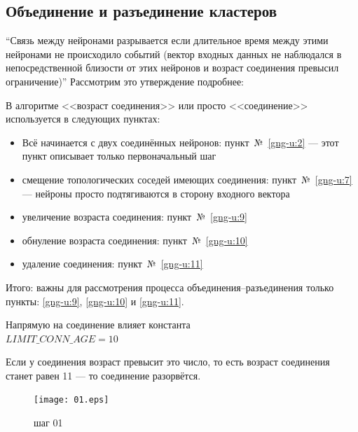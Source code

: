 \documentclass[unicode, 12pt, a4paper,oneside,fleqn]{article}
\begin{document}
\subsection{Объединение и разъединение кластеров}
``Связь между нейронами разрывается если длительное время между этими
нейронами не происходило событий (вектор входных данных не наблюдался
в непосредственной близости от этих нейронов и возраст соединения
превысил ограничение)'' Рассмотрим это утверждение подробнее:

В алгоритме <<возраст соединения>> или просто <<соединение>>
используется в следующих пунктах:
\begin{itemize}
\item Всё начинается с двух соединённых нейронов: пункт~№~\ref{gng-u:2} ---
  этот пункт описывает только первоначальный шаг
\item смещение топологических соседей имеющих соединения: пункт~№~\ref{gng-u:7}
  --- нейроны просто подтягиваются в сторону входного вектора
\item увеличение возраста соединения: пункт~№~\ref{gng-u:9}
\item обнуление возраста соединения: пункт~№~\ref{gng-u:10}
\item удаление соединения: пункт~№~\ref{gng-u:11}
\end{itemize}
Итого: важны для рассмотрения процесса объединения--разъединения
только пункты: \ref{gng-u:9}, \ref{gng-u:10} и \ref{gng-u:11}.

Напрямую на соединение влияет константа\\
$LIMIT\_CONN\_AGE = 10$

Если у соединения возраст превысит это число, то есть возраст
соединения станет равен 11 --- то соединение разорвётся.

\begin{figure}[h]
  \center
  \texttt{[image: 01.eps]} %
  \caption{шаг 01}
  \label{conn-step:01}
\end{figure}


\newpage


\end{document}
